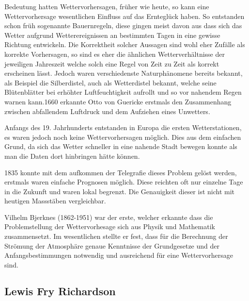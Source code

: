 \begin{refsection}
Bedeutung hatten Wettervorhersagen, früher wie heute, so kann eine Wettervorhersage wesentlichen Einfluss auf das Ernteglück haben. So entstanden schon früh sogenannte Bauernregeln, diese gingen meist davon aus dass sich das Wetter aufgrund Wetterereignissen an bestimmten Tagen in eine gewisse Richtung entwickeln. Die Korrektheit solcher Aussagen sind wohl eher Zufälle als korrekte Vorhersagen, so sind es eher die ähnlichen Wetterverhältnisse der jeweiligen Jahreszeit welche solch eine Regel von Zeit zu Zeit als korrekt erscheinen lässt. Jedoch waren verschiedenste Naturphänomene bereits bekannt, als Beispiel die Silberdistel, auch als Wetterdistel bekannt, welche seine Blütenblätter bei erhöhter Luftfeuchtigkeit aufrollt und so vor nahendem Regen warnen kann.1660 erkannte Otto von Guericke erstmals den Zusammenhang zwischen abfallendem Luftdruck und dem Aufziehen eines Unwetters.

Anfangs des 19. Jahrhunderts entstanden in Europa die ersten Wetterstationen, es waren jedoch noch keine Wettervorhersagen möglich. Dies aus dem einfachen Grund, da sich das Wetter schneller in eine nahende Stadt bewegen konnte als man die Daten dort hinbringen hätte können.

1835 konnte mit dem aufkommen der Telegrafie dieses Problem gelöst werden, erstmals waren einfache Prognosen möglich. Diese reichten oft nur einzelne Tage in die Zukunft und waren lokal begrenzt. Die Genauigkeit dieser ist nicht mit heutigen Massstäben vergleichbar.

Vilhelm Bjerknes (1862-1951) war der erste, welcher erkannte dass die Problemstellung der Wettervorhesage sich aus Physik und Mathematik zusammensetzt. Im wesentlichen stellte er fest, dass für die Berechnung der Strömung der Atmosphäre genaue Kenntnisse der Grundgesetze und der Anfangsbestimmungen notwendig und ausreichend für eine Wettervorhersage sind.



\subsection{Lewis Fry Richardson
\label{klima:subsection:richardson}}


\end{refsection}
